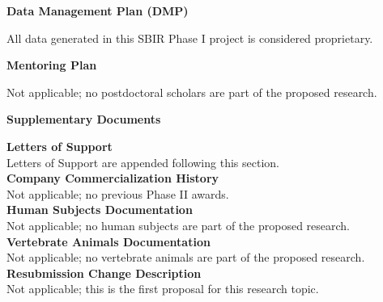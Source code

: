 \documentclass[11pt]{article}
\begin{document}
\newpage
{\bf \Huge Data Management Plan (DMP)}

All data generated in this SBIR Phase I project is considered proprietary.








\newpage
{\bf \Huge Mentoring Plan}

Not applicable; no postdoctoral scholars are part of the proposed research.








\newpage
{\bf \Huge Supplementary Documents \\}

{\bf \Large Letters of Support}  \\
Letters of Support are appended following this section.  \\

{\bf \Large Company Commercialization History}  \\
Not applicable; no previous Phase II awards.  \\

{\bf \Large Human Subjects Documentation}  \\
Not applicable; no human subjects are part of the proposed research.  \\

{\bf \Large Vertebrate Animals Documentation}  \\
Not applicable; no vertebrate animals are part of the proposed research.  \\

{\bf \Large Resubmission Change Description}  \\
Not applicable; this is the first proposal for this research topic.  \\
\end{document}
